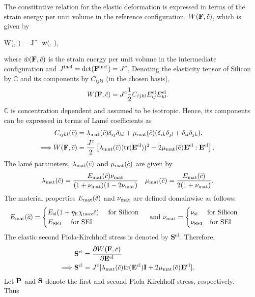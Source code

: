 The constitutive relation for the elastic deformation is expressed in terms of the strain energy per unit volume in the reference configuration, $W(\mathbf{F}, \tilde{c})$, which is given by
\begin{nonumbereq}
    W(\F, \tc) = J^{\inel} \bar{w}(\F, \tc),
\end{nonumbereq}where $\bar{w}(\mathbf{F}, \tilde{c})$ is the strain energy per unit volume in the intermediate configuration and $J^{{\rm{inel}}} = \mathrm{det}(\mathbf{F}^{{\rm{inel}}}) = {J^c}$. Denoting the elasticity tensor of Silicon by $\mathbb{C}$ and its components by $C_{ijkl}$ (in the chosen basis),
\begin{gather}
    W(\mathbf{F}, \tilde{c}) = {J^c} \frac{1}{2} C_{ijkl} E_{ij}^{{\rm{el}}} E_{kl}^{{\rm{el}}}.
\end{gather}
$\mathbb{C}$ is concentration dependent and assumed to be isotropic. Hence, its components can be expressed in terms of Lam\'{e} coefficients as 
\begin{align}
    C_{ijkl}(\tilde{c}) &= \lambda_{\rm{mat}}(\tilde{c})\delta_{ij} \delta_{kl} +  \mu_{\rm{mat}}(\tilde{c})(\delta_{ik} \delta_{jl} + \delta_{il} \delta_{jk}). \\
    \Longrightarrow W(\mathbf{F}, \tilde{c}) &= \frac{{J^c}}{2}\left[\lambda_{\rm{mat}}(\tilde{c}) (\rm{tr}(\mathbf{E}^{\rm{el}}))^2 + 2 \mu_{\rm{mat}}(\tilde{c}) \mathbf{E}^{{\rm{el}}}:\mathbf{E}^{{\rm{el}}}\right].
\end{align}
The lam\'{e} parameters, $\lambda_{\rm{mat}}(\tilde{c})$ and $\mu_{\rm{mat}}(\tilde{c})$ are given by
\begin{align}
    \lambda_{\rm{mat}}(\tilde{c}) = \frac{E_{\rm{mat}}(\tilde{c}) \nu_{\rm{mat}}}{(1+\nu_{\rm{mat}})(1-2\nu_{\rm{mat}})} 
    && \mu_{\rm{mat}}(\tilde{c}) = \frac{E_{\rm{mat}}(\tilde{c})}{2(1+\nu_{\rm{mat}})}. \nonumber
\end{align}
The material properties $E_{\rm{mat}}(\tilde{c})$ and $\nu_{\rm{mat}}$ are defined domainwise as follows:
\[E_{\rm{mat}}(\tilde{c}) = \begin{cases}
     E_{\text{si}}(1 + \eta_{\rm{E}} \chi_{\rm{max}} \tilde{c}) \text{  \quad for Silicon} \\
     E_{\rm{SEI}} \text{ \quad  for SEI }
\end{cases} \text{ and }
\nu_{\rm{mat}} = \begin{cases}
     \nu_{{\rm{si}}}\text{ \quad for Silicon} \\
     \nu_{\rm{SEI}} \text{\quad for SEI }
\end{cases}\]
The elastic second Piola-Kirchhoff stress is denoted by $\mathbf{S}^{\rm{el}}$. Therefore, 
\begin{align}
    \mathbf{S}^{\rm{el}} &= \frac{\partial W(\mathbf{F}, \tilde{c})}{\partial \mathbf{E}^{{\rm{el}}}}\nonumber \\
    \Longrightarrow  \mathbf{S}^{\rm{el}} &= {J^c}[\lambda_{\rm{mat}}(\tilde{c}) \rm{tr}(\mathbf{E}^{\rm{el}})\mathbf{I} + 2 \mu_{\rm{mat}}(\tilde{c}) \mathbf{E}^{\rm{el}} ]. \label{eq:Sel_tensor}
\end{align}
Let $\mathbf{P}$ and $\mathbf{S}$ denote the first and second Piola-Kirchhoff stress, respectively. Thus
